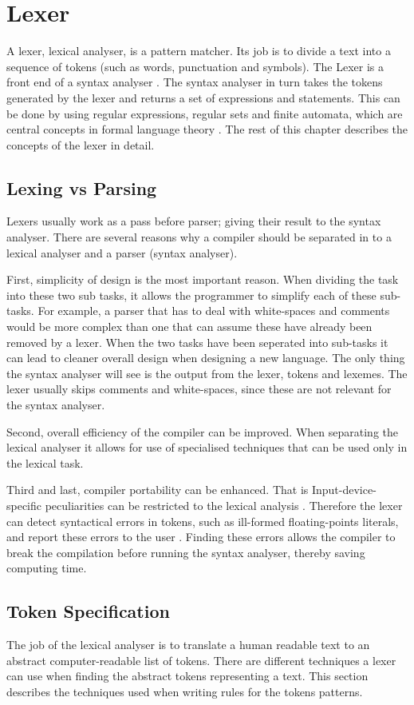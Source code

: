 \chapter{Lexer}
A lexer, lexical analyser, is a pattern matcher. Its job is to divide a text into a sequence of tokens (such as words, punctuation and symbols). The Lexer is a front end of a syntax 
analyser \cite{sebesta2012}. The syntax analyser in turn takes the tokens
generated by the lexer and returns a set of expressions and statements.
This can be done by using regular expressions, regular sets and finite
automata, which are central concepts in formal language theory \cite{Aho1990}.
The rest of this chapter describes the concepts of the lexer in detail.

\section{Lexing vs Parsing}
Lexers usually work as a pass before parser; giving their result to the syntax 
analyser.
There are several reasons why a compiler should be separated in to a lexical 
analyser and a parser (syntax analyser). 

First, simplicity of design is the most
important reason. When dividing the task into these two sub tasks, it allows the
programmer to simplify each of these sub-tasks. For example, a parser that has to 
deal with white-spaces and comments would be more complex 
than one that can assume these have already been removed by 
a lexer. When the two tasks have been seperated into sub-tasks it can lead to 
cleaner overall design when designing a new language.
The only thing the syntax analyser will see is the output from the 
lexer, tokens and lexemes.
The lexer usually skips comments and white-spaces, since these are not relevant 
for the syntax analyser.

Second, overall efficiency of the compiler can be improved. When separating the 
lexical analyser it allows for use of specialised techniques that can be used 
only in the lexical task.

Third and last, compiler portability can be enhanced. That is Input-device-specific 
peculiarities can be restricted to the lexical analysis \cite{Aho2006}.
Therefore the lexer can detect syntactical errors in tokens, such as ill-formed 
floating-points literals, and report these errors to the user \cite{sebesta2012}.
Finding these errors allows the compiler to break the compilation before
running the syntax analyser, thereby saving computing time. 
\section{Token Specification}
The job of the lexical analyser is to translate a human readable text to an abstract 
computer-readable list of tokens. There are different techniques a lexer can
use when finding the abstract tokens representing a text. This section describes the
techniques used when writing rules for the tokens patterns. 
